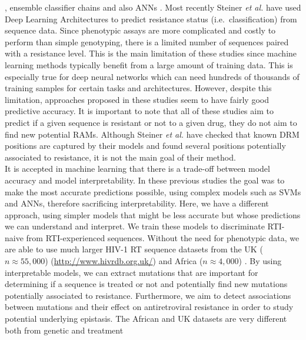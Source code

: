 \documentclass[
  11,
]{scrbook}
\begin{document}
\autocite{beerenwinkelGeno2phenoInterpretingGenotypic2001,arayaSupportVectorMachine2009},
ensemble classifier chains
\autocite{riemenschneiderExploitingHIV1Protease2016a,heiderMultilabelClassificationExploiting2013b}
and also ANNs \autocite{draghiciPredictingHIVDrug2003}. Most recently Steiner
\emph{et al.} \autocite{steinerDrugResistancePrediction2020a} have used Deep Learning
Architectures to predict resistance status (i.e.~classification) from
sequence data. Since phenotypic assays are more complicated and costly
to perform than simple genotyping, there is a limited number of
sequences paired with a resistance level. This is the main limitation of
these studies since machine learning methods typically benefit from a
large amount of training data. This is especially true for deep neural
networks which can need hundreds of thousands of training samples for
certain tasks and architectures. However, despite this limitation,
approaches proposed in these studies seem to have fairly good predictive
accuracy. It is important to note that all of these studies aim to
predict if a given sequence is resistant or not to a given drug, they do
not aim to find new potential RAMs. Although Steiner \emph{et al.}
\autocite{steinerDrugResistancePrediction2020a} have checked that known DRM
positions are captured by their models and found several positions
potentially associated to resistance, it is not the main goal of their
method.\\
It is accepted in machine learning that there is a trade-off between
model accuracy and model interpretability. In these previous studies the
goal was to make the most accurate predictions possible, using complex
models such as SVMs and ANNs, therefore sacrificing interpretability.
Here, we have a different approach, using simpler models that might be
less accurate but whose predictions we can understand and interpret. We
train these models to discriminate RTI-naive from RTI-experienced
sequences. Without the need for phenotypic data, we are able to use much
larger HIV-1 RT sequence datasets from the UK (\(n\approx55,000\))
(\url{http://www.hivrdb.org.uk/}) and Africa (\(n\approx4,000\))
\autocite{villabona-arenasIndepthAnalysisHIV12016}. By using interpretable
models, we can extract mutations that are important for determining if a
sequence is treated or not and potentially find new mutations
potentially associated to resistance. Furthermore, we aim to detect
associations between mutations and their effect on antiretroviral
resistance in order to study potential underlying epistasis. The African
and UK datasets are very different both from genetic and treatment
\end{document}

